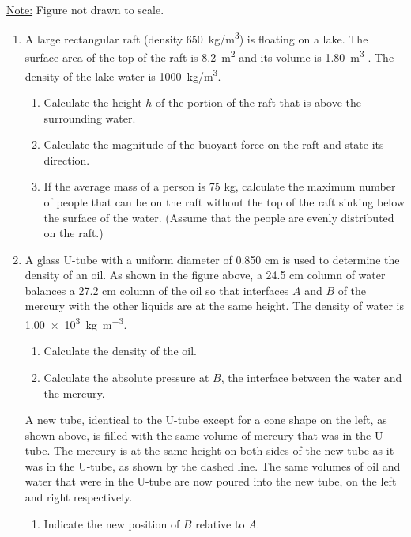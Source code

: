 \documentclass{../../../oss-apphys}
\begin{document}
\begin{center}
  \\
  \underline{Note:} Figure not drawn to scale.
\end{center}
\begin{enumerate}[leftmargin=15pt]
\item A large rectangular raft (density \SI{650}{kg/m^3}) is floating on a
  lake. The surface area of the top of the raft is \SI{8.2}{m^2} and its volume
  is \SI{1.80}{m^3} . The density of the lake water is \SI{1000}{kg/m^3}.
  \begin{enumerate}[leftmargin=18pt]
  \item Calculate the height $h$ of the portion of the raft that is above the
    surrounding water.
  \item Calculate the magnitude of the buoyant force on the raft and state its
    direction.
  \item If the average mass of a person is 75 kg, calculate the maximum number
    of people that can be on the raft without the top of the raft sinking below
    the surface of the water. (Assume that the people are evenly distributed on
    the raft.)
  \end{enumerate}
  \newpage
  
  \begin{center}
  \end{center}
  \item A glass U-tube with a uniform diameter of 0.850 cm is used to determine
  the density of an oil. As shown in the figure above, a 24.5 cm column of
  water balances a 27.2 cm column of the oil so that interfaces $A$ and $B$ of
  the mercury with the other liquids are at the same height. The density of
  water is \SI{1.00e3}{\kilo\gram\per\metre^3}.
  \begin{enumerate}[leftmargin=18pt]
  \item Calculate the density of the oil.
  \item Calculate the absolute pressure at $B$, the interface between the water
    and the mercury.
  \end{enumerate}
  \begin{center}
  \end{center}
  A new tube, identical to the U-tube except for a cone shape on the left, as
  shown above, is filled with the same volume of mercury that was in the
  U-tube. The mercury is at the same height on both sides of the new tube as it
  was in the U-tube, as shown by the dashed line. The same volumes of oil and
  water that were in the U-tube are now poured into the new tube, on the left
  and right respectively.
  \begin{enumerate}[leftmargin=18pt,resume]
  \item Indicate the new position of $B$ relative to $A$.
    

\end{enumerate}
\end{enumerate}
\end{document}
